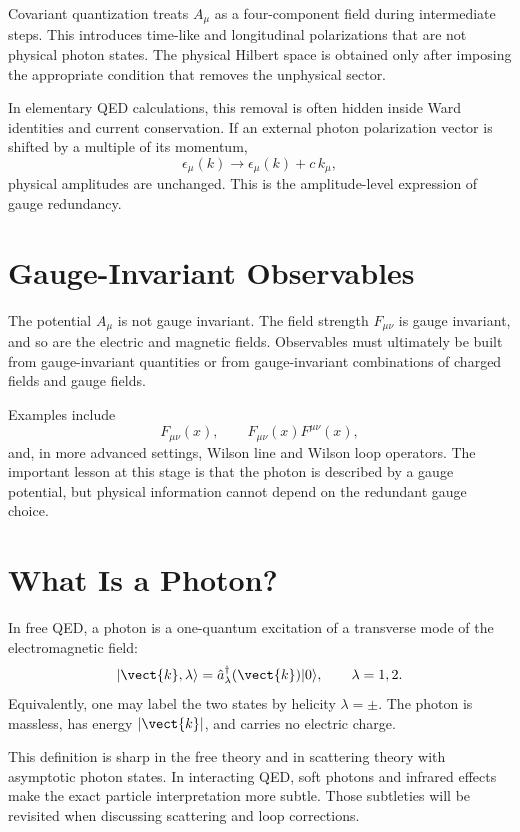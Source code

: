 Covariant quantization treats \(A_\mu\) as a four-component field during
intermediate steps. This introduces time-like and longitudinal polarizations
that are not physical photon states. The physical Hilbert space is obtained only
after imposing the appropriate condition that removes the unphysical sector.

In elementary QED calculations, this removal is often hidden inside Ward
identities and current conservation. If an external photon polarization vector is
shifted by a multiple of its momentum,
\[
    \epsilon_\mu(k)\longrightarrow \epsilon_\mu(k)+c\,k_\mu,
\]
physical amplitudes are unchanged. This is the amplitude-level expression of
gauge redundancy.

\section{Gauge-Invariant Observables}

The potential \(A_\mu\) is not gauge invariant. The field strength
\(F_{\mu\nu}\) is gauge invariant, and so are the electric and magnetic fields.
Observables must ultimately be built from gauge-invariant quantities or from
gauge-invariant combinations of charged fields and gauge fields.

Examples include
\[
    F_{\mu\nu}(x),
    \qquad
    F_{\mu\nu}(x)F^{\mu\nu}(x),
\]
and, in more advanced settings, Wilson line and Wilson loop operators. The
important lesson at this stage is that the photon is described by a gauge
potential, but physical information cannot depend on the redundant gauge choice.

\section{What Is a Photon?}

In free QED, a photon is a one-quantum excitation of a transverse mode of the
electromagnetic field:
\[
    |\vect{k},\lambda\rangle
    = \hat a_{\lambda}^{\dagger}(\vect{k})|0\rangle,
    \qquad
    \lambda=1,2.
\]
Equivalently, one may label the two states by helicity \(\lambda=\pm\). The
photon is massless, has energy \(|\vect{k}|\), and carries no electric charge.

This definition is sharp in the free theory and in scattering theory with
asymptotic photon states. In interacting QED, soft photons and infrared effects
make the exact particle interpretation more subtle. Those subtleties will be
revisited when discussing scattering and loop corrections.


